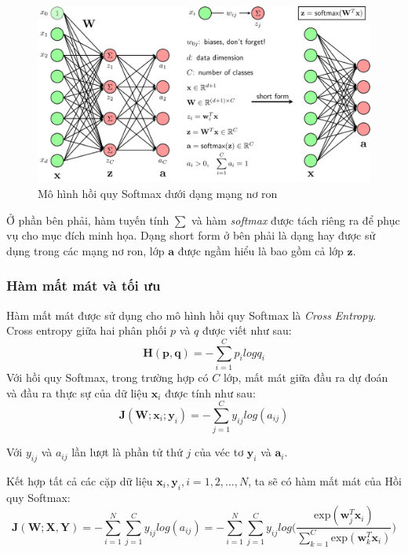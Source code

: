 \begin{figure}[h!]
    \centering
    \includegraphics[width=1\textwidth]{figures/softmax_nn.png} %
    \caption{Mô hình hồi quy Softmax dưới dạng mạng nơ ron} %
    \label{fig:1} %
\end{figure}

Ở phần bên phải, hàm tuyến tính $\sum$ và hàm \emph{softmax} được tách riêng ra để phục vụ cho mục đích minh họa. Dạng short form ở bên phải là dạng hay được sử dụng trong các mạng nơ ron, lớp $\textbf{a}$ được ngầm hiểu là bao gồm cả lớp $\textbf{z}$.

\subsubsection{Hàm mất mát và tối ưu}

Hàm mất mát được sử dụng cho mô hình hồi quy Softmax là \emph{Cross Entropy}.
Cross entropy giữa hai phân phối $p$ và $q$ được viết như sau:
\begin{equation*}
    \textbf{H}(\textbf{p},\textbf{q}) = - \sum^C_{i=1}p_ilogq_i
\end{equation*}
Với hồi quy Softmax, trong trường hợp có $C$ lớp, mất mát giữa đầu ra dự đoán và đầu ra thực sự của dữ liệu $\textbf{x}_i$ được tính như sau:
\begin{equation*}
    \textbf{J}(\textbf{W};\textbf{x}_i;\textbf{y}_i) = - \sum^C_{j=1}y_{ij}log(a_{ij})
\end{equation*}

Với $y_{ij}$ và $a_{ij}$ lần lượt là phần tử thứ $j$ của véc tơ $\textbf{y}_i$ và $\textbf{a}_i$.

Kết hợp tất cả các cặp dữ liệu $\textbf{x}_i, \textbf{y}_i, i = 1,2,\dots,N$, ta sẽ có hàm mất mát của Hồi quy Softmax:
\begin{equation*}
    \textbf{J}(\textbf{W};\textbf{X},\textbf{Y}) = - \sum^N_{i=1}\sum^C_{j=1}y_{ij}log(a_{ij}) = - \sum^N_{i=1}\sum^C_{j=1}y_{ij}log\Big(\frac{\text{exp}(\textbf{w}^T_j\textbf{x}_i)}{\sum^C_{k=1}\text{exp}(\textbf{w}^T_k\textbf{x}_i)}\Big)
\end{equation*}

